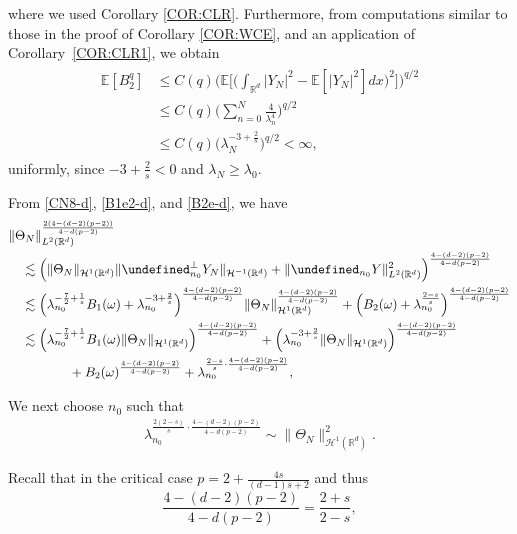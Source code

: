 \documentclass[%
11pt,  reqno]{amsart}
\theoremstyle{remarkstyle}
\newcommand{\1}{\hspace{0.2mm}\text{I}\hspace{0.2mm}}
\newcommand{\noi}{\noindent}
\newcommand{\R}{\mathbb{R}}
\let\P= \undefined
\newcommand{\P}{\mathbf{P}}
\newcommand{\E}{\mathbb{E}}
\newcommand{\ld}{\lambda}
\renewcommand{\o}{\omega}
\newcommand{\les}{\lesssim}
\numberwithin{equation}{section}
\numberwithin{theorem}{section}
\begin{document}
	\noi 
	where we used Corollary \ref{COR:CLR}.
	Furthermore, from computations similar to those in the proof of Corollary \ref{COR:WCE}, and an application of Corollary~\ref{COR:CLR1}, we obtain
	\begin{align}
		\begin{split}
			\E [B_2^q] & \le C(q)\bigg( \E\bigg[\bigg(\int_{\R^d} |Y_N|^2 - \E[|Y_N|^2] dx\bigg)^2\bigg] \bigg)^{q/2} \\
			& \le C(q)\bigg( \sum_{n=0}^N \frac4{\ld_n^4} \bigg)^{q/2} \\
			& \le C(q) \big(\ld_N^{-3+\frac2s}\big)^{q/2} < \infty, 
		\end{split}
		\label{B2ea-d}
	\end{align}
	uniformly, since $-3+\frac2s <0$ and $\ld_N \ge \ld_0$.
	
	From \eqref{CN8-d}, \eqref{B1e2-d}, and \eqref{B2e-d}, we have
	\begin{align}
		\label{CN9-d}
		\begin{split}
			&\| \Theta_N\|_{L^2(\R^d)}^{\frac{2(4-(d-2)(p-2))}{4-d(p-2)}}  \\
			&\quad \les \Big(\| \Theta_N \|_{\mathcal H^1(\R^d)} \| \P^{\perp}_{n_0} Y_N \|_{\mathcal H^{-1}(\R^d)} +  \| \P_{n_0} Y \|_{L^2(\R^d)}^2 \Big)^{\frac{4-(d-2)(p-2)}{4-d(p-2)}} \\
			&\quad \les \Big( \ld_{n_0}^{-\frac72 + \frac1s}  B_1(\o) + \ld_{n_0}^{-3+\frac2s} \Big)^{\frac{4-(d-2)(p-2)}{4-d(p-2)}}  \| \Theta_N \|_{\mathcal H^1(\R^d)}^{\frac{4-(d-2)(p-2)}{4-d(p-2)}}   + \Big(B_2(\o)  + \ld_{n_0}^{\frac{2-s}s } \Big)^{\frac{4-(d-2)(p-2)}{4-d(p-2)}} \\
			&\quad \les \Big( \ld_{n_0}^{-\frac72 + \frac1s}  B_1(\o)   \| \Theta_N \|_{\mathcal H^1(\R^d)}\Big)^{\frac{4-(d-2)(p-2)}{4-d(p-2)}} + \Big( \ld_{n_0}^{-3+\frac2s}    \| \Theta_N \|_{\mathcal H^1(\R^d)}\Big)^{\frac{4-(d-2)(p-2)}{4-d(p-2)}}  \\
			&\quad \hphantom{XXXX} + B_2(\o)^{\frac{4-(d-2)(p-2)}{4-d(p-2)}}  + \ld_{n_0}^{\frac{2-s}s \cdot {\frac{4-(d-2)(p-2)}{4-d(p-2)}} },
		\end{split}
	\end{align}
	
	\noi 
	We next choose $n_0$ such that
	\begin{align}
		\label{sizeM-d}
		\ld_{n_0}^{\frac{2(2-s)}s \cdot {\frac{4-(d-2)(p-2)}{4-d(p-2)}} } \sim \| \Theta_N \|_{\mathcal H^1(\R^d)}^2.
	\end{align}
	
	
	\noi 
	Recall that in the critical case $p = 2+\frac{4s}{(d-1)s+2}$ and thus 
	\[
	\frac{4-(d-2)(p-2)}{4-d(p-2)} = \frac{2+s}{2-s},
	\]
	
\end{document}
